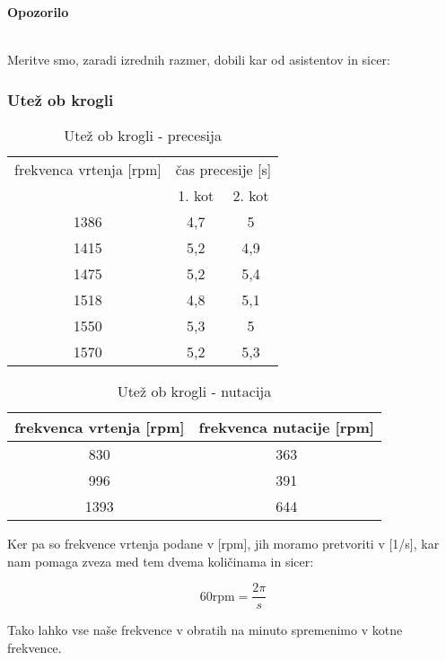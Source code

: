 \documentclass[11pt, a4paper]{article}
\theoremstyle{definition}
\theoremstyle{example}
\theoremstyle{izrek}
\begin{document}
\begin{large}\textbf{Opozorilo}\end{large}\\
\medskip
Meritve smo, zaradi izrednih razmer, dobili kar od asistentov in sicer:

\subsubsection{Utež ob krogli}

\begin{table}[h]
	
	\centering
	\begin{tabular}{|c|c c|}
		
		\hline
		frekvenca vrtenja [rpm] & \multicolumn{2}{|c|}{čas precesije [s]} \\
		 & 1. kot & 2. kot \\
		\hline
		\hline
		1386 &	4,7 &	5\\
		\hline
		1415 &	5,2 &	4,9\\
		\hline
		1475 &	5,2	&   5,4\\
		\hline
		1518 &	4,8	&	5,1\\
		\hline
		1550 &	5,3	&	5\\
		\hline
		1570 &	5,2	&	5,3\\
		\hline
		
	\end{tabular}
	\caption{Utež ob krogli - precesija}
\end{table}

\begin{table}[h]
	
	\centering
	\begin{tabular}{|c|c|}
		\hline
		frekvenca vrtenja [rpm] & frekvenca nutacije [rpm]\\
		\hline
		\hline
		830	&	363\\
		\hline
		996	& 	391\\
		\hline
		1393 &	644\\
		\hline
	
		
	\end{tabular}
	\caption{Utež ob krogli - nutacija}
	
\end{table}

Ker pa so frekvence vrtenja podane v [rpm], jih moramo pretvoriti v [1/s], kar nam pomaga zveza med tem dvema količinama in sicer:

$$60 \text{rpm}=\frac{2\pi}{s}$$

Tako lahko vse naše frekvence v obratih na minuto spremenimo v kotne frekvence. \\
\end{document}
